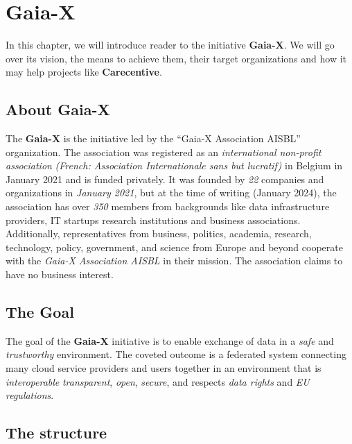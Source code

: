 \chapter{Gaia-X}\label{ch:gaiax}

\begin{chapterabstract}
    In this chapter, we will introduce reader to the initiative \textbf{Gaia-X}.
    We will go over its vision, the means to achieve them, their target organizations and how it may help projects like \textbf{Carecentive}.
\end{chapterabstract}

\section{About Gaia-X}\label{sec:about-gaia-x}

The \textbf{Gaia-X} is the initiative led by the ``Gaia-X Association AISBL'' organization.
The association was registered as an \textit{international non-profit association} \textit{(French: Association Internationale sans but lucratif)} in Belgium in January 2021 and is funded privately.
It was founded by \textit{22} companies and organizations in \textit{January 2021}, but at the time of writing (January 2024), the association has over \textit{350} members from backgrounds like data infrastructure providers, IT startups research institutions and business associations. %
Additionally, representatives from business, politics, academia, research, technology, policy, government, and science from Europe and beyond cooperate with the \textit{Gaia-X Association AISBL} in their mission.
The association claims to have no business interest.~\cite{gaiax}

\section{The Goal}\label{sec:gaia-x-goal}

The goal of the \textbf{Gaia-X} initiative is to enable exchange of data in a \textit{safe} and \textit{trustworthy} environment.
The coveted outcome is a federated system connecting many cloud service providers and users together in an environment that is \textit{interoperable} \textit{transparent}, \textit{open}, \textit{secure}, and respects \textit{data rights} and \textit{EU regulations}.~\cite{gaiax}

\section{The structure}\label{sec:the-structure}

